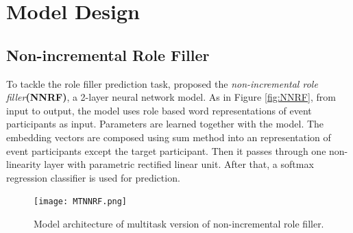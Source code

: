 \documentclass[a4paper]{article}
\begin{document}
\section{Model Design}
\subsection{Non-incremental Role Filler} \label{sec:nnrf}
To tackle the role filler prediction task, \citet{tilk2016event} proposed the \textit{non-incremental role filler}\textbf{(NNRF)}, a 2-layer neural network model. As in Figure \ref{fig:NNRF}, from input to output, the model uses role based word representations of event participants as input. Parameters are learned together with the model. The embedding vectors are composed using sum method into an representation of event participants except the target participant. Then it passes through one non-linearity layer with parametric rectified linear unit. After that, a softmax regression classifier is used for prediction. 


\begin{figure}[t]
\centering
\texttt{[image: MTNNRF.png]}
\caption{\label{fig:MTNNRF} Model architecture of multitask version of non-incremental role filler.}
\end{figure}
\end{document}
